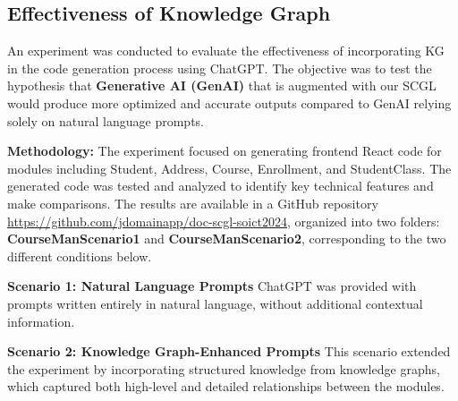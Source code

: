 \documentclass[runningheads]{llncs}
\begin{document}
\subsection{Effectiveness of Knowledge Graph}
An experiment was conducted to evaluate the effectiveness of incorporating KG in the code generation process using ChatGPT. The objective was to test the hypothesis that \textbf{Generative AI (GenAI)} that is augmented with our SCGL would produce more optimized and accurate outputs compared to GenAI relying solely on natural language prompts. 

\textbf{Methodology:} The experiment focused on generating frontend React code for modules including Student, Address, Course, Enrollment, and StudentClass. The generated code was tested and analyzed to identify key technical features and make comparisons. The results are available in a GitHub repository \url{https://github.com/jdomainapp/doc-scgl-soict2024}, organized into two folders: \textbf{CourseManScenario1} and \textbf{CourseManScenario2}, corresponding to the two different conditions below.

\textbf{Scenario 1: Natural Language Prompts}
ChatGPT was provided with prompts written entirely in natural language, without additional contextual information. 

\textbf{Scenario 2: Knowledge Graph-Enhanced Prompts}
This scenario extended the experiment by incorporating structured knowledge from knowledge graphs, which captured both high-level and detailed relationships between the modules.
\end{document}
